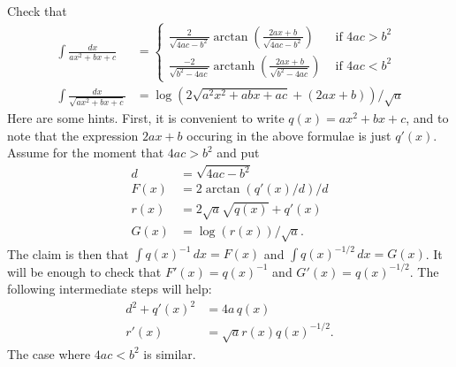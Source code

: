 \documentclass[a4paper]{book}
\newcommand{\arctanh}  {\operatorname{arctanh}}
\renewcommand{\:}{\colon}
\theoremstyle{definition}
\newenvironment{starex}{
 \renewcommand{\thetheorem}{\arabic{chapter}.\arabic{section}.\arabic{theorem}${}^*$}
 \exercise
}{\endexercise}
\begin{document}
\begin{starex}
 Check that
 \begin{align*}
  \int \frac{dx}{ax^2+bx+c} &= 
   \begin{cases} \frac{2}{\sqrt{4ac-b^2}}
                 \arctan\left(\frac{2ax+b}{\sqrt{4ac-b^2}}\right) &
                  \text{ if } 4ac > b^2 \\
                 \frac{-2}{\sqrt{b^2-4ac}}
                 \arctanh\left(\frac{2ax+b}{\sqrt{b^2-4ac}}\right) &
                  \text{ if } 4ac < b^2
   \end{cases} \\
  \int \frac{dx}{\sqrt{ax^2+bx+c}} &=
   \log(2\sqrt{a^2x^2+abx+ac}+(2ax+b))/\sqrt{a}
 \end{align*}
 Here are some hints.  First, it is convenient to write
 $q(x)=ax^2+bx+c$, and to note that the expression $2ax+b$ occuring in
 the above formulae is just $q'(x)$.  Assume for the moment that
 $4ac>b^2$ and put 
 \begin{align*}
  d    &= \sqrt{4ac-b^2} \\
  F(x) &= 2\arctan(q'(x)/d)/d \\
  r(x) &= 2\sqrt{a}\sqrt{q(x)}+q'(x) \\
  G(x) &= \log(r(x))/\sqrt{a}.
 \end{align*}
 The claim is then that $\int q(x)^{-1}\,dx=F(x)$ and
 $\int q(x)^{-1/2}\,dx=G(x)$.  It will be enough to check that
 $F'(x)=q(x)^{-1}$ and $G'(x)=q(x)^{-1/2}$.  The following
 intermediate steps will help:
 \begin{align*}
  d^2+q'(x)^2 &= 4a\,q(x) \\
  r'(x) &= \sqrt{a}r(x)q(x)^{-1/2}.
 \end{align*}
 The case where $4ac<b^2$ is similar.
\end{starex}
\end{document}
